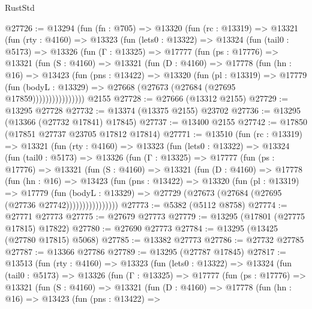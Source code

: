 \begin{lexlean}{RustStd}
\begin{coremodule}
@27726 := @13294
    (fun (fn : @705) =>
    @13320
      (fun (rc : @13319) =>
      @13321
        (fun (rty : @4160) =>
        @13323
          (fun (lets0 : @13322) =>
          @13324
            (fun (tail0 : @5173) =>
            @13326
              (fun (Γ : @13325) =>
              @17777
                (fun (ps : @17776) =>
                @13321
                  (fun (S : @4160) =>
                  @13321
                    (fun (D : @4160) =>
                    @17778
                      (fun (hn : @16) =>
                      @13423
                        (fun (pns : @13422) =>
                        @13320
                          (fun (pl : @13319) =>
                          @17779
                            (fun (bodyL : @13329) =>
                            @27668 (@27673 (@27684 (@27695 @17859))))))))))))))))
    @2155
@27728 := @27666 (@13312 @2155)
@27729 := @13295 @27728
@27732 := @13374 (@13375 @2155) @23702
@27736 := @13295 (@13366 (@27732 @17841) @17845)
@27737 := @13400 @2155
@27742 := @17850 (@17851 @27737 @23705 @17812 @17814)
@27771 := @13510
    (fun (rc : @13319) =>
    @13321
      (fun (rty : @4160) =>
      @13323
        (fun (lets0 : @13322) =>
        @13324
          (fun (tail0 : @5173) =>
          @13326
            (fun (Γ : @13325) =>
            @17777
              (fun (ps : @17776) =>
              @13321
                (fun (S : @4160) =>
                @13321
                  (fun (D : @4160) =>
                  @17778
                    (fun (hn : @16) =>
                    @13423
                      (fun (pns : @13422) =>
                      @13320
                        (fun (pl : @13319) =>
                        @17779
                          (fun (bodyL : @13329) =>
                          @27729 (@27673 (@27684 (@27695 (@27736 @27742))))))))))))))))
@27773 := @5382 (@5112 @8758)
@27774 := @27771 @27773
@27775 := @27679 @27773
@27779 := @13295 (@17801 (@27775 @17815) @17822)
@27780 := @27690 @27773
@27784 := @13295 (@13425 (@27780 @17815) @5068)
@27785 := @13382 @27773
@27786 := @27732 @27785
@27787 := @13366 @27786
@27789 := @13295 (@27787 @17845)
@27817 := @13513
    (fun (rty : @4160) =>
    @13323
      (fun (lets0 : @13322) =>
      @13324
        (fun (tail0 : @5173) =>
        @13326
          (fun (Γ : @13325) =>
          @17777
            (fun (ps : @17776) =>
            @13321
              (fun (S : @4160) =>
              @13321
                (fun (D : @4160) =>
                @17778
                  (fun (hn : @16) =>
                  @13423
                    (fun (pns : @13422) =>

\end{coremodule}
\end{lexlean}
